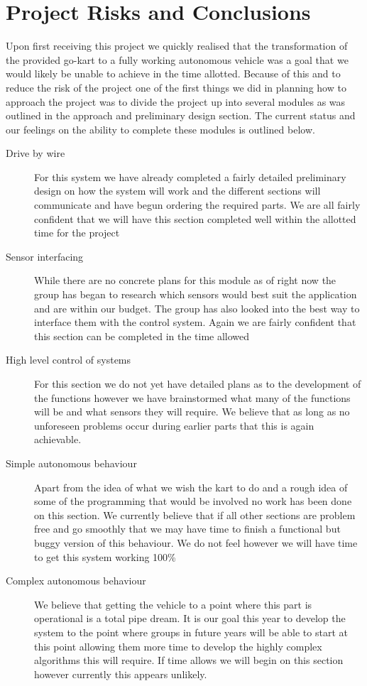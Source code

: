 \chapter{Project Risks and Conclusions}

Upon first receiving this project we quickly realised that the transformation of the provided go-kart to a fully working autonomous vehicle was a goal that we would likely be unable to achieve in the time allotted. Because of this and to reduce the risk of the project one of the first things we did in planning how to approach the project was to divide the project up into several modules as was outlined in the approach and preliminary design section. The current status and our feelings on the ability to complete these modules is outlined below.

\begin{description}
\item[Drive by wire] For this system we have already completed a fairly detailed preliminary design on how the system will work and the different sections will communicate and have begun ordering the required parts. We are all fairly confident that we will have this section completed well within the allotted time for the project

\item[Sensor interfacing] While there are no concrete plans for this module as of right now the group has began to research which sensors would best suit the application and are within our budget. The group has also looked into the best way to interface them with the control system. Again we are fairly confident that this section can be completed in the time allowed

\item[High level control of systems] For this section we do not yet have detailed plans as to the development of the functions however we have brainstormed what many of the functions will be and what sensors they will require. We believe that as long as no unforeseen problems occur during earlier parts that this is again achievable.

\item[Simple autonomous behaviour] Apart from the idea of what we wish the kart to do and a rough idea of some of the programming that would be involved no work has been done on this section. We currently believe that if all other sections are problem free and go smoothly that we may have time to finish a functional but buggy version of this behaviour. We do not feel however we will have time to get this system working 100\%

\item[Complex autonomous behaviour] We believe that getting the vehicle to a point where this part is operational is a total pipe dream. It is our goal this year to develop the system to the point where groups in future years will be able to start at this point allowing them more time to develop the highly complex algorithms this will require. If time allows we will begin on this section however currently this appears unlikely.
\end{description}